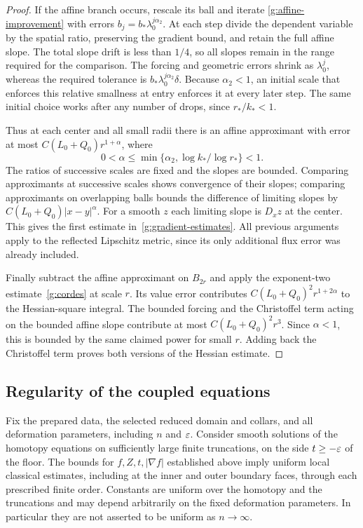 \begin{proof}
If the affine branch occurs, rescale its ball and iterate
\eqref{g:affine-improvement} with errors
$b_j=b_*\lambda_0^{j\alpha_2}$.  At each step divide the dependent
variable by the spatial ratio, preserving the gradient bound, and
retain the full affine slope.  The total slope drift is less than
$1/4$, so all slopes remain in the range required for the comparison.
The forcing and geometric errors shrink as $\lambda_0^j$, whereas
the required tolerance is $b_*\lambda_0^{j\alpha_2}\delta$.
Because $\alpha_2<1$, an initial scale that enforces this relative
smallness at entry enforces it at every later step.  The same initial
choice works after any number of drops, since $r_*/k_*<1$.

Thus at each center and all small radii there is an affine approximant
with error at most $C(L_0+Q_0)r^{1+\alpha}$, where
\[
 0<\alpha\leq
       \min\{\alpha_2,\log k_*/\log r_*\}<1.
\]
The ratios of successive scales are fixed and the slopes are bounded.
Comparing approximants at successive scales shows convergence of their
slopes; comparing approximants on overlapping balls bounds the difference
of limiting slopes by $C(L_0+Q_0)|x-y|^\alpha$.  For a smooth $z$ each
limiting slope is $D_xz$ at the center.  This gives the first estimate
in~\eqref{g:gradient-estimates}.  All previous arguments apply to the
reflected Lipschitz metric, since its only additional flux error was
already included.

Finally subtract the affine approximant on $B_{2r}$ and apply the
exponent-two estimate~\eqref{g:cordes} at scale $r$.  Its value error
contributes $C(L_0+Q_0)^2r^{1+2\alpha}$ to the Hessian-square integral.
The bounded forcing and the Christoffel term acting on the bounded
affine slope contribute at most $C(L_0+Q_0)^2r^3$.  Since $\alpha<1$,
this is bounded by the same claimed power for small $r$.  Adding back
the Christoffel term proves both versions of the Hessian estimate.
\end{proof}

\subsection{Regularity of the coupled equations}

\begin{proposition}
\label{g:regularity}
Fix the prepared data, the selected reduced domain and collars, and all
deformation parameters, including $n$ and $\varepsilon$.  Consider smooth
solutions of the homotopy equations on sufficiently large finite
truncations, on the side $t\geq-\varepsilon$ of the floor.  The bounds for
$f,Z,t,|\nabla f|$ established above imply uniform local classical
estimates, including at the inner and outer boundary faces, through each
prescribed finite order.  Constants are uniform over the homotopy and
the truncations and may depend arbitrarily on the fixed deformation
parameters.  In particular they are not asserted to be uniform as
$n\to\infty$.
\end{proposition}


